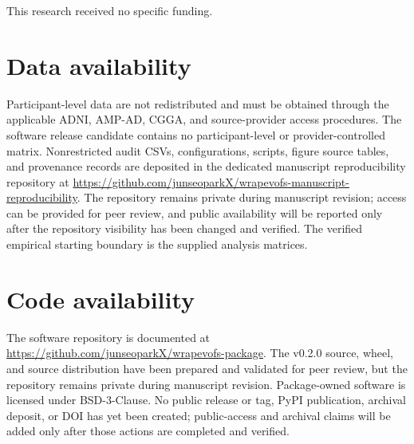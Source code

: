 This research received no specific funding.

\FloatBarrier
\section{Data availability}

Participant-level data are not redistributed and must be obtained through the applicable ADNI, AMP-AD, CGGA, and source-provider access procedures. The software release candidate contains no participant-level or provider-controlled matrix. Nonrestricted audit CSVs, configurations, scripts, figure source tables, and provenance records are deposited in the dedicated manuscript reproducibility repository at \url{https://github.com/junseoparkX/wrapevofs-manuscript-reproducibility}. The repository remains private during manuscript revision; access can be provided for peer review, and public availability will be reported only after the repository visibility has been changed and verified. The verified empirical starting boundary is the supplied analysis matrices.

\FloatBarrier
\section{Code availability}

The software repository is documented at \url{https://github.com/junseoparkX/wrapevofs-package}. The v0.2.0 source, wheel, and source distribution have been prepared and validated for peer review, but the repository remains private during manuscript revision. Package-owned software is licensed under BSD-3-Clause. No public release or tag, PyPI publication, archival deposit, or DOI has yet been created; public-access and archival claims will be added only after those actions are completed and verified.

\FloatBarrier
